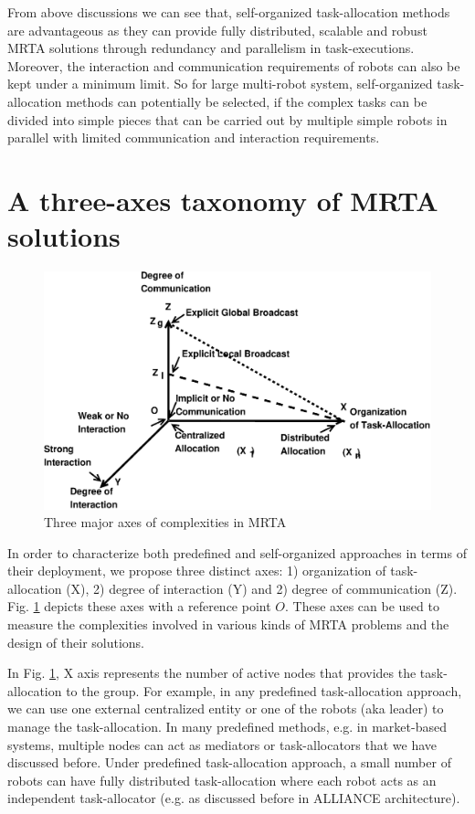 \documentclass[preprint,12pt]{elsarticle}
\begin{document}
From above discussions we can see that, self-organized task-allocation methods are advantageous as they can provide fully distributed, scalable and robust MRTA solutions through redundancy and parallelism in task-executions. Moreover, the interaction and communication requirements of robots can also be kept under a minimum limit.  So for large multi-robot system, self-organized task-allocation methods  can potentially be selected, if the complex tasks can be divided into simple pieces that can be carried out by multiple simple robots in parallel with limited communication and interaction requirements.
\section{A three-axes taxonomy of MRTA solutions}
\label{sec:taxonomy}
\begin{figure}
\centering
\includegraphics[width=12cm, angle=0]
{./images/mrta-lines.eps}
\caption{ Three major axes of complexities in MRTA}
\label{fig:mrta-complexities} %
\end{figure}
In order to characterize both predefined and self-organized approaches in terms of their deployment, we propose three distinct axes: 1) organization of task-allocation (X), 2) degree of interaction (Y) and 2) degree of communication (Z). Fig. \ref{fig:mrta-complexities} depicts these axes with a reference point $O$. These axes can be used to measure the complexities involved in various kinds of MRTA problems and the design of their solutions. 

In Fig. \ref{fig:mrta-complexities}, X axis represents the number of active nodes that provides the task-allocation to the group. For example, in any predefined  task-allocation approach, we can use one external centralized entity or one of the robots (aka leader) to manage the task-allocation. In many predefined methods, e.g. in market-based systems,  multiple nodes can act as mediators or task-allocators that we have discussed before. Under predefined task-allocation approach,  a small number of robots can have fully distributed task-allocation where each robot acts as an independent task-allocator (e.g. as discussed before in ALLIANCE architecture). 
\end{document}

